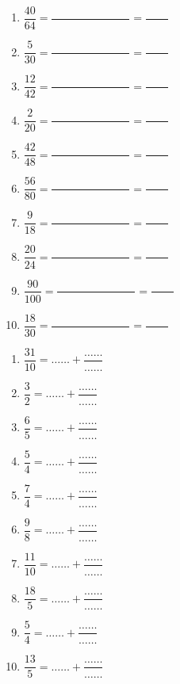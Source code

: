 \documentclass[9pt]{article}
\begin{document}
\begin{multicols}{2}
\begin{exercice}
\begin{enumerate}
	\item $ \dfrac{40}{64} = \dfrac{\phantom{00000000000000}}{} = \dfrac{\phantom{0000}}{} $
	\item $ \dfrac{5}{30} = \dfrac{\phantom{00000000000000}}{} = \dfrac{\phantom{0000}}{} $
	\item $ \dfrac{12}{42} = \dfrac{\phantom{00000000000000}}{} = \dfrac{\phantom{0000}}{} $
	\item $ \dfrac{2}{20} = \dfrac{\phantom{00000000000000}}{} = \dfrac{\phantom{0000}}{} $
	\item $ \dfrac{42}{48} = \dfrac{\phantom{00000000000000}}{} = \dfrac{\phantom{0000}}{} $
	\item $ \dfrac{56}{80} = \dfrac{\phantom{00000000000000}}{} = \dfrac{\phantom{0000}}{} $
	\item $ \dfrac{9}{18} = \dfrac{\phantom{00000000000000}}{} = \dfrac{\phantom{0000}}{} $
	\item $ \dfrac{20}{24} = \dfrac{\phantom{00000000000000}}{} = \dfrac{\phantom{0000}}{} $
	\item $ \dfrac{90}{100} = \dfrac{\phantom{00000000000000}}{} = \dfrac{\phantom{0000}}{} $
	\item $ \dfrac{18}{30} = \dfrac{\phantom{00000000000000}}{} = \dfrac{\phantom{0000}}{} $
\end{enumerate}
\end{exercice}

\begin{exercice}
\begin{enumerate}
	\item $ \dfrac{31}{10} = \ldots\ldots + \dfrac{\ldots\ldots}{\ldots\ldots} $
	\item $ \dfrac{3}{2} = \ldots\ldots + \dfrac{\ldots\ldots}{\ldots\ldots} $
	\item $ \dfrac{6}{5} = \ldots\ldots + \dfrac{\ldots\ldots}{\ldots\ldots} $
	\item $ \dfrac{5}{4} = \ldots\ldots + \dfrac{\ldots\ldots}{\ldots\ldots} $
	\item $ \dfrac{7}{4} = \ldots\ldots + \dfrac{\ldots\ldots}{\ldots\ldots} $
	\item $ \dfrac{9}{8} = \ldots\ldots + \dfrac{\ldots\ldots}{\ldots\ldots} $
	\item $ \dfrac{11}{10} = \ldots\ldots + \dfrac{\ldots\ldots}{\ldots\ldots} $
	\item $ \dfrac{18}{5} = \ldots\ldots + \dfrac{\ldots\ldots}{\ldots\ldots} $
	\item $ \dfrac{5}{4} = \ldots\ldots + \dfrac{\ldots\ldots}{\ldots\ldots} $
	\item $ \dfrac{13}{5} = \ldots\ldots + \dfrac{\ldots\ldots}{\ldots\ldots} $
\end{enumerate}
\end{exercice}


\end{multicols}
\end{document}
